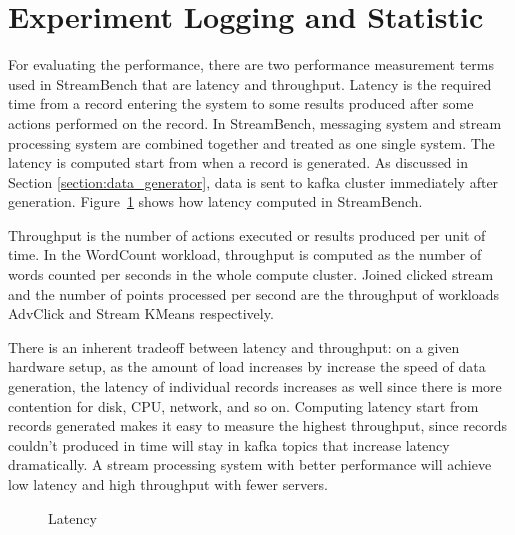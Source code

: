 \section{Experiment Logging and Statistic}
\label{section:log_statistic}

For evaluating the performance, there are two performance measurement terms used in StreamBench that are latency and throughput. Latency is the required time from a record entering the system to some results produced after some actions performed on the record. In StreamBench, messaging system and stream processing system are combined together and treated as one single system. The latency is computed start from when a record is generated. As discussed in Section \ref{section:data_generator}, data is sent to kafka cluster immediately after generation. Figure~\ref{fig:latency} shows how latency computed in StreamBench. 

Throughput is the number of actions executed or results produced per unit of time. In the WordCount workload, throughput is computed as the number of words counted per seconds in the whole compute cluster. Joined clicked stream and the number of points processed per second are the throughput of workloads AdvClick and Stream KMeans respectively.

There is an inherent tradeoff between latency and throughput: on a given hardware setup, as the amount of load increases by increase the speed of data generation, the latency of individual records increases as well since there is more contention for disk, CPU, network, and so on. Computing latency start from records generated makes it easy to measure the highest throughput, since records couldn't produced in time will stay in kafka topics that increase latency dramatically. A stream processing system with better performance will achieve low latency and high throughput with fewer servers.

\begin{figure}
  \begin{center}
   \caption{Latency}
   \label{fig:latency}
  \end{center}
\end{figure}

